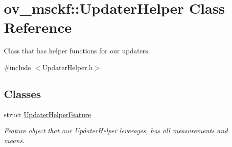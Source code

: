 \hypertarget{classov__msckf_1_1UpdaterHelper}{}\section{ov\+\_\+msckf\+:\+:Updater\+Helper Class Reference}
\label{classov__msckf_1_1UpdaterHelper}


Class that has helper functions for our updaters.  




{\ttfamily \#include $<$Updater\+Helper.\+h$>$}

\subsection*{Classes}
\begin{DoxyCompactItemize}
\item 
struct \hyperlink{structov__msckf_1_1UpdaterHelper_1_1UpdaterHelperFeature}{Updater\+Helper\+Feature}
\begin{DoxyCompactList}\small\item\em Feature object that our \hyperlink{classov__msckf_1_1UpdaterHelper}{Updater\+Helper} leverages, has all measurements and means. \end{DoxyCompactList}\end{DoxyCompactItemize}
